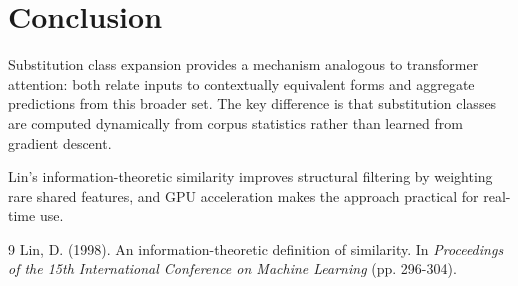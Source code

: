 \documentclass[11pt,a4paper]{article}
\begin{document}
\section{Conclusion}

Substitution class expansion provides a mechanism analogous to transformer attention: both relate inputs to contextually equivalent forms and aggregate predictions from this broader set. The key difference is that substitution classes are computed dynamically from corpus statistics rather than learned from gradient descent.

Lin's information-theoretic similarity improves structural filtering by weighting rare shared features, and GPU acceleration makes the approach practical for real-time use.

\begin{thebibliography}{9}
Lin, D. (1998). An information-theoretic definition of similarity. In \emph{Proceedings of the 15th International Conference on Machine Learning} (pp. 296-304).
\end{thebibliography}
\end{document}
